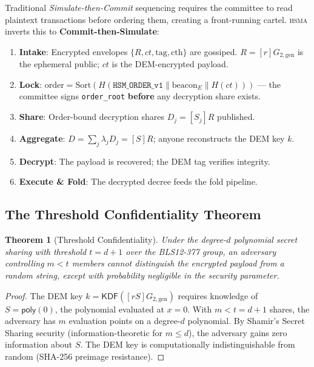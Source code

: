 \documentclass[11pt, a4paper]{article}
\newtheorem{theorem}{Theorem}
\newcommand{\hsma}{\textsc{hsma}}
\begin{document}
Traditional \textit{Simulate-then-Commit} sequencing requires the committee to read plaintext transactions before ordering them, creating a front-running cartel. \hsma{} inverts this to \textbf{Commit-then-Simulate}:

\begin{enumerate}
\item \textbf{Intake}: Encrypted envelopes $\{R, ct, \text{tag}, \text{cth}\}$ are gossiped. $R = [r]G_{2,\mathrm{gen}}$ is the ephemeral public; $ct$ is the DEM-encrypted payload.
\item \textbf{Lock}: $\text{order} = \text{Sort}(H(\texttt{HSM\_ORDER\_v1} \| \text{beacon}_E \| H(ct)))$ --- the committee signs \texttt{order\_root} \textbf{before} any decryption share exists.
\item \textbf{Share}: Order-bound decryption shares $D_j = [S_j]R$ published.
\item \textbf{Aggregate}: $D = \sum_j \lambda_j D_j = [S]R$; anyone reconstructs the DEM key $k$.
\item \textbf{Decrypt}: The payload is recovered; the DEM tag verifies integrity.
\item \textbf{Execute \& Fold}: The decrypted decree feeds the fold pipeline.
\end{enumerate}

\subsection{The Threshold Confidentiality Theorem}

\begin{theorem}[Threshold Confidentiality]
\label{thm:threshold}
Under the degree-$d$ polynomial secret sharing with threshold $t = d+1$ over the BLS12-377 group, an adversary controlling $m < t$ members cannot distinguish the encrypted payload from a random string, except with probability negligible in the security parameter.
\end{theorem}
\begin{proof}
The DEM key $k = \mathsf{KDF}([rS]G_{2,\mathrm{gen}})$ requires knowledge of $S = \mathsf{poly}(0)$, the polynomial evaluated at $x = 0$. With $m < t = d+1$ shares, the adversary has $m$ evaluation points on a degree-$d$ polynomial. By Shamir's Secret Sharing security (information-theoretic for $m \le d$), the adversary gains zero information about $S$. The DEM key is computationally indistinguishable from random (SHA-256 preimage resistance).
\end{proof}
\end{document}
